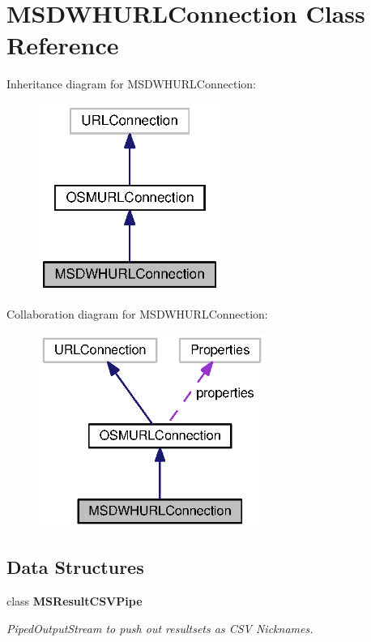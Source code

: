 \section{M\+S\+D\+W\+H\+U\+R\+L\+Connection Class Reference}
\label{classorg_1_1smallfoot_1_1parser_1_1msosmsql_1_1MSDWHURLConnection}


Inheritance diagram for M\+S\+D\+W\+H\+U\+R\+L\+Connection\+:\nopagebreak
\begin{figure}[H]
\begin{center}
\leavevmode
\includegraphics[width=168pt]{classorg_1_1smallfoot_1_1parser_1_1msosmsql_1_1MSDWHURLConnection__inherit__graph}
\end{center}
\end{figure}


Collaboration diagram for M\+S\+D\+W\+H\+U\+R\+L\+Connection\+:
\nopagebreak
\begin{figure}[H]
\begin{center}
\leavevmode
\includegraphics[width=209pt]{classorg_1_1smallfoot_1_1parser_1_1msosmsql_1_1MSDWHURLConnection__coll__graph}
\end{center}
\end{figure}
\subsection*{Data Structures}
\begin{DoxyCompactItemize}
\item 
class {\bf M\+S\+Result\+C\+S\+V\+Pipe}
\begin{DoxyCompactList}\small\item\em Piped\+Output\+Stream to push out resultsets as C\+S\+V Nicknames. \end{DoxyCompactList}\end{DoxyCompactItemize}
